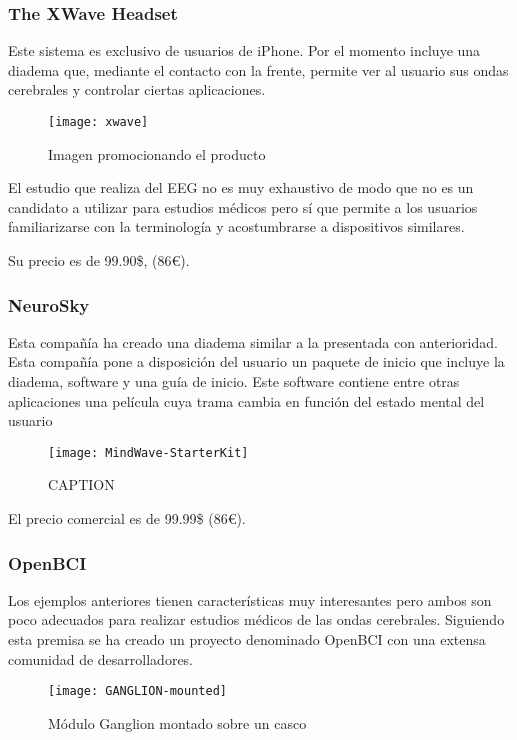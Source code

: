 \subsubsection{The XWave Headset}

Este sistema es exclusivo de usuarios de iPhone. Por el momento incluye una diadema que, mediante el contacto con la frente, permite ver al usuario sus ondas cerebrales y controlar ciertas aplicaciones.

\begin{figure} [h]
    \centering
    \texttt{[image: xwave]}
    \caption{Imagen promocionando el producto}
    \label{fig:xwave}
\end{figure}

El estudio que realiza del EEG no es muy exhaustivo de modo que no es un candidato a utilizar para estudios médicos pero sí que permite a los usuarios familiarizarse con la terminología y acostumbrarse a dispositivos similares.

Su precio es de 99.90\$, (86€).

\subsubsection{NeuroSky}

Esta compañía ha creado una diadema similar a la presentada con anterioridad. Esta compañía pone a disposición del usuario un paquete de inicio que incluye la diadema, software y una guía de inicio. Este software contiene entre otras aplicaciones una película cuya trama cambia en función del estado mental del usuario

\begin{figure} [h]
    \centering
    \texttt{[image: MindWave-StarterKit]}
    \caption{CAPTION}
    \label{fig:MindWave-StarterKit}
\end{figure}

El precio comercial es de 99.99\$ (86€).

\subsubsection{OpenBCI}

Los ejemplos anteriores tienen características muy interesantes pero ambos son poco adecuados para realizar estudios médicos de las ondas cerebrales. Siguiendo esta premisa se ha creado un proyecto denominado OpenBCI con una extensa comunidad de desarrolladores.

\begin{figure} [H]
    \centering
    \texttt{[image: GANGLION-mounted]}
    \caption{Módulo Ganglion montado sobre un casco \cite{OpenBCI}}
    \label{fig:GANGLION-mounted}
\end{figure}

